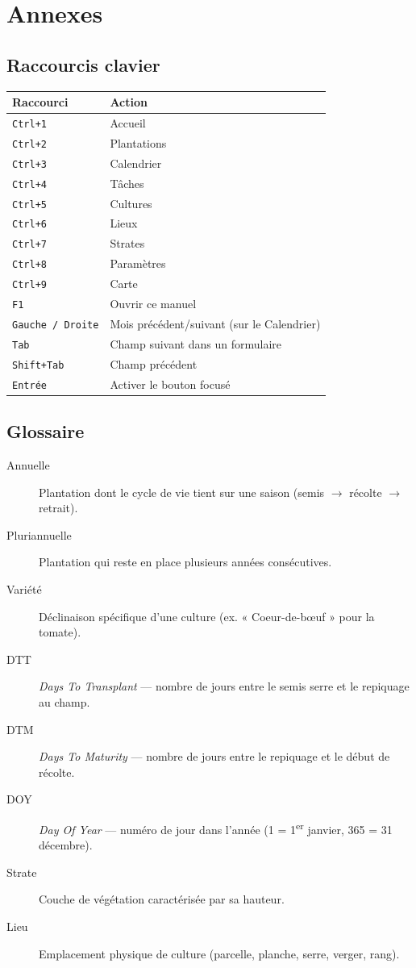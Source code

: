 \chapter{Annexes}
\label{chap:annexes}

\section{Raccourcis clavier}

\begin{tabularx}{\linewidth}{lX}
  \textbf{Raccourci} & \textbf{Action} \\
  \hline
  \texttt{Ctrl+1} & Accueil \\
  \texttt{Ctrl+2} & Plantations \\
  \texttt{Ctrl+3} & Calendrier \\
  \texttt{Ctrl+4} & Tâches \\
  \texttt{Ctrl+5} & Cultures \\
  \texttt{Ctrl+6} & Lieux \\
  \texttt{Ctrl+7} & Strates \\
  \texttt{Ctrl+8} & Paramètres \\
  \texttt{Ctrl+9} & Carte \\
  \texttt{F1} & Ouvrir ce manuel \\
  \texttt{Gauche / Droite} & Mois précédent/suivant (sur le Calendrier) \\
  \texttt{Tab} & Champ suivant dans un formulaire \\
  \texttt{Shift+Tab} & Champ précédent \\
  \texttt{Entrée} & Activer le bouton focusé \\
\end{tabularx}

\section{Glossaire}

\begin{description}
  \item[Annuelle] Plantation dont le cycle de vie tient sur une saison (semis $\to$ récolte $\to$ retrait).
  \item[Pluriannuelle] Plantation qui reste en place plusieurs années consécutives.
  \item[Variété] Déclinaison spécifique d'une culture (ex. « Coeur-de-bœuf » pour la tomate).
  \item[DTT] \emph{Days To Transplant} — nombre de jours entre le semis serre et le repiquage au champ.
  \item[DTM] \emph{Days To Maturity} — nombre de jours entre le repiquage et le début de récolte.
  \item[DOY] \emph{Day Of Year} — numéro de jour dans l'année (1 = 1\textsuperscript{er} janvier, 365 = 31 décembre).
  \item[Strate] Couche de végétation caractérisée par sa hauteur.
  \item[Lieu] Emplacement physique de culture (parcelle, planche, serre, verger, rang).
\end{description}

